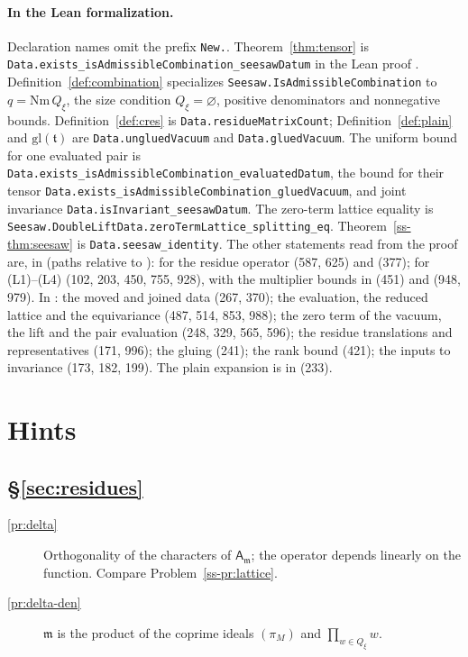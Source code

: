 \documentclass[reqno]{amsart}
\theoremstyle{definition}
\theoremstyle{plain}
\newcommand{\Nm}{\mathrm{Nm}\,}
\newcommand{\gl}{\mathrm{gl}}
\newcommand{\tl}[1]{\texttt{#1}}
\begin{document}
\paragraph{In the Lean formalization.}
{\raggedright Declaration names omit the prefix \tl{New.}.  Theorem~\ref{thm:tensor} is \tl{Data.exists\_isAdmissibleCombination\_seesawDatum} in the Lean proof \cite{GL}.  Definition~\ref{def:combination} specializes \tl{Seesaw.IsAdmissibleCombination} to \(q=\Nm Q_\xi\), the size condition \(Q_\xi=\varnothing\), positive denominators and nonnegative bounds.  Definition~\ref{def:cres} is \tl{Data.residueMatrixCount}; Definition~\ref{def:plain} and \(\gl(\mathfrak t)\) are \tl{Data.ungluedVacuum} and \tl{Data.gluedVacuum}.  The uniform bound for one evaluated pair is \tl{Data.exists\_isAdmissibleCombination\_evaluatedDatum}, the bound for their tensor \tl{Data.exists\_isAdmissibleCombination\_gluedVacuum}, and joint invariance \tl{Data.isInvariant\_seesawDatum}.  The zero-term lattice equality is \tl{Seesaw.DoubleLiftData.zeroTermLattice\_splitting\_eq}.  Theorem~\ref{ss-thm:seesaw} is \tl{Data.seesaw\_identity}.  The other statements read from the proof are, in \cite{GL} (paths relative to ): for the residue operator  (587, 625) and  (377); for (L1)--(L4)  (102, 203, 450, 755, 928), with the multiplier bounds in  (451) and  (948, 979).  In : the moved and joined data  (267, 370); the evaluation, the reduced lattice and the equivariance  (487, 514, 853, 988); the zero term of the vacuum, the lift and the pair evaluation  (248, 329, 565, 596); the residue translations and representatives  (171, 996); the gluing  (241); the rank bound  (421); the inputs to invariance  (173, 182, 199).  The plain expansion is in  (233).\par}

\section*{Hints}

\subsection*{\S\ref{sec:residues}}
\begin{description}
\item[\ref{pr:delta}] Orthogonality of the characters of \(\mathsf A_{\mathfrak m}\); the operator depends linearly on the function.  Compare Problem~\ref{ss-pr:lattice}.
\item[\ref{pr:delta-den}] \(\mathfrak m\) is the product of the coprime ideals \((\pi_M)\) and \(\prod_{w\in Q_\xi}w\).
\end{description}
\end{document}
